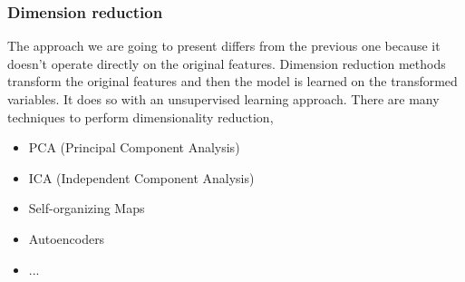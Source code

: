 \documentclass[main.tex]{subfiles}
\begin{document}
\subsubsection{Dimension reduction}
The approach we are going to present differs from the previous one because it doesn't operate directly on the original features. Dimension reduction methods transform the original features and then the model is learned on the transformed variables. It does so with an unsupervised learning approach. There are many techniques to perform dimensionality reduction,
\begin{itemize}
    \item PCA (Principal Component Analysis)
    \item ICA (Independent Component Analysis)
    \item Self-organizing Maps
    \item Autoencoders
    \item ...
\end{itemize}
\end{document}
